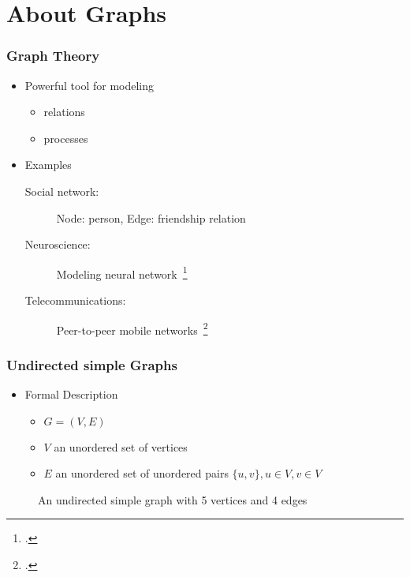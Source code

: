\section{About Graphs}
\begin{frame}
	\frametitle{Graph Theory}
	\begin{itemize}
		\item Powerful tool for modeling
			\begin{itemize}
				\item relations
				\item processes
			\end{itemize}
		\item Examples
			\begin{description}
				\item [Social network:] Node: person, Edge: friendship relation
				\item [Neuroscience:] Modeling neural network~\footcite{BuSp09}
				\item [Telecommunications:] Peer-to-peer mobile networks~\footcite{FaCh99}
			\end{description}
	\end{itemize}
\end{frame}

\begin{frame}
	\frametitle{Undirected simple Graphs}
	\begin{itemize}
		\item Formal Description
			\begin{itemize}
				\item $G = (V,E)$
				\item $V$ an unordered set of vertices
				\item $E$ an unordered set of unordered pairs $\{u,v\}, u \in V, v \in V$
			\end{itemize}
	\end{itemize}
	\begin{figure}
		\begin{center}
			
		\end{center}
		\caption{An undirected simple graph with 5 vertices and 4 edges}
	\end{figure}
\end{frame}


